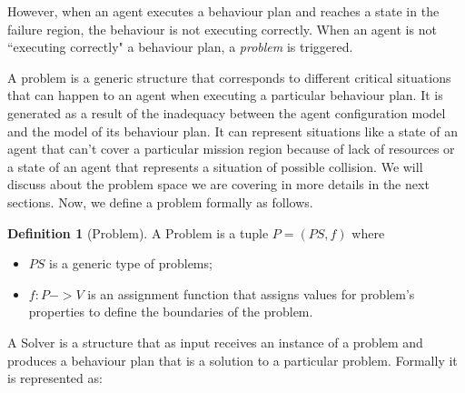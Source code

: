 \documentclass[journal]{IEEEtran}
\theoremstyle{definition}
\newtheorem{definition}{Definition}
\begin{document}



However, when an agent executes a behaviour plan and reaches a state in the failure region, the behaviour is not executing correctly. When an agent is not ``executing correctly" a behaviour plan, a \textit{problem} is triggered.

A problem is a generic structure that corresponds to different critical situations that can happen to an agent when executing a particular behaviour plan. It is generated as a result of the inadequacy between the agent configuration model and the model of its behaviour plan. It can represent situations like a state of an agent that can't cover a particular mission region because of lack of resources or a state of an agent that represents a situation of possible collision.
We will discuss about the problem space  we are covering in more details in the next sections. Now, we define a problem formally as follows.


\begin{definition}[Problem]
A Problem is a tuple $P= (PS, f)$ where 
\begin{itemize}
\item $PS$ is a generic type of problems;
\item  $f: P ->  V$ is an assignment function that assigns values for problem's properties to define the boundaries of the problem.
\end{itemize}
\end{definition}






A Solver is a structure that as input receives an instance of a problem and produces a behaviour plan that is a solution to a particular problem. Formally it is represented as:
\end{document}
